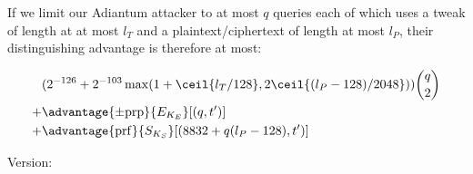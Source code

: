 \documentclass[journal=tosc,preprint,floatrow,submission]{iacrtrans}
\begin{document}
If we limit our Adiantum attacker to at most $q$ queries each of which uses a tweak of length at
at most $l_T$ and a plaintext/ciphertext of length at most $l_P$, their distinguishing advantage
is therefore at most:

\begin{align*}
&( 2^{-126} + 2^{-103}\max(1 + \ceil{l_T/128}, 2\ceil{(l_P - 128)/2048}))\binom{q}{2} \\
+& \advantage{\pm \mathrm{prp}}{E_{K_E}}[(q, t')] \\
+& \advantage{\mathrm{prf}}{S_{K_S}}[(8832 + q(l_P - 128), t')] \\
\end{align*}

Version: \texttt{}
\end{document}
